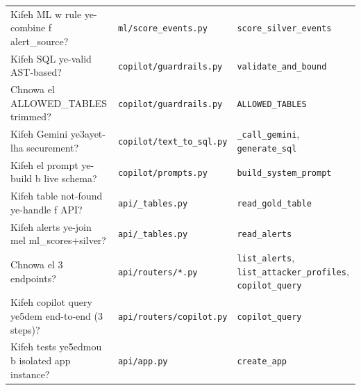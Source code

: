 \documentclass[11pt,a4paper]{report}
\DeclareRobustCommand{\code}[1]{\texttt{#1}}
\DeclareRobustCommand{\file}[1]{\texttt{\color{amber}#1}}
\begin{document}
\begin{longtable}{p{} p{} p{}}
Kifeh ML w rule ye-combine f alert\_source? & \file{ml/score\_events.py} & \code{score\_silver\_events} \\
Kifeh SQL ye-valid AST-based? & \file{copilot/guardrails.py} & \code{validate\_and\_bound} \\
Chnowa el ALLOWED\_TABLES trimmed? & \file{copilot/guardrails.py} & \code{ALLOWED\_TABLES} \\
Kifeh Gemini ye3ayet-lha securement? & \file{copilot/text\_to\_sql.py} & \code{\_call\_gemini}, \code{generate\_sql} \\
Kifeh el prompt ye-build b live schema? & \file{copilot/prompts.py} & \code{build\_system\_prompt} \\
Kifeh table not-found ye-handle f API? & \file{api/\_tables.py} & \code{read\_gold\_table} \\
Kifeh alerts ye-join mel ml\_scores+silver? & \file{api/\_tables.py} & \code{read\_alerts} \\
Chnowa el 3 endpoints? & \file{api/routers/*.py} & \code{list\_alerts}, \code{list\_attacker\_profiles}, \code{copilot\_query} \\
Kifeh copilot query ye5dem end-to-end (3 steps)? & \file{api/routers/copilot.py} & \code{copilot\_query} \\
Kifeh tests ye5edmou b isolated app instance? & \file{api/app.py} & \code{create\_app} \\
\bottomrule
\end{longtable}
\end{document}
